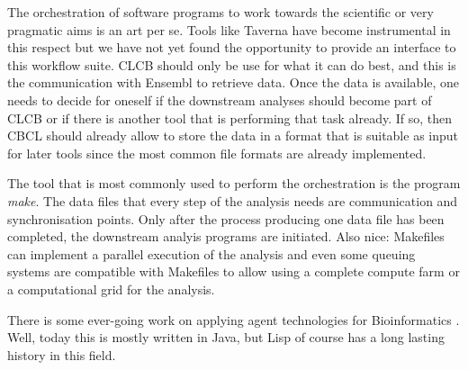 \documentclass{book}
\newcommand\CLCB{CLCB }
\begin{document}
The orchestration of software programs to work towards the scientific
or very pragmatic aims is an art per se. Tools like Taverna have become
instrumental in this respect but we have not yet found the opportunity
to provide an interface to this workflow suite. \CLCB should only be
use for what it can do best, and this is the communication with Ensembl
to retrieve data. Once the data is available, one needs to decide for
oneself if the downstream analyses should become part of \CLCB or if
there is another tool that is performing that task already. If so,
then CBCL should already allow to store the data in a format that is
suitable as input for later tools since the most common file formats
are already implemented.

The tool that is most commonly used to perform the orchestration is 
the program {\em make}. The data files that every step of the analysis needs
are communication and synchronisation points. Only after the process producing one
data file has been completed, the downstream analyis programs are initiated.
Also nice: Makefiles can implement a parallel execution of the analysis and 
even some queuing systems are compatible with Makefiles to allow using a complete
compute farm or a computational grid for the analysis.

There is some ever-going work on applying agent technologies for
Bioinformatics \cite{agents:2007}. Well, today this is mostly written
in Java, but Lisp of course has a long lasting history in this field.



\end{document}
